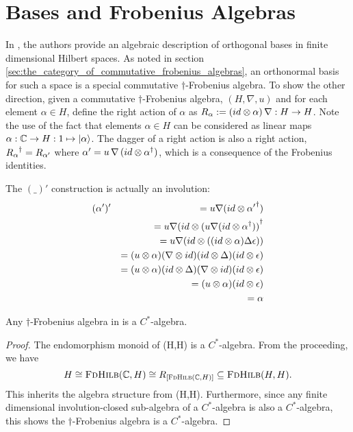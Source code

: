 \section{Bases and Frobenius Algebras} %
\label{sec:bases_and_frobenius_algebras}
In \cite{coeckeetal08:ortho}, the authors provide an algebraic description of orthogonal bases in
finite dimensional Hilbert spaces. As noted in section
\ref{sec:the_category_of_commutative_frobenius_algebras}, an orthonormal basis for such a space is
a special commutative $\dagger$-Frobenius algebra. To show the other direction, given a commutative
$\dagger$-Frobenius algebra, $(H,\nabla,u)$ and for each element $\alpha\in H$, define the right
action of $\alpha$ as $R_{\alpha}:=(id\otimes\alpha)\, \nabla:H\to H$. Note the use of the fact that
elements $\alpha\in H$ can be considered as linear maps $\alpha:\mathbb{C} \to H:1\mapsto \left\vert{\alpha}\right\rangle$.
The dagger of a right action is also a right action, ${R_{\alpha}}^{\dagger} = R_{\alpha'}$ where
$\alpha'= u\, \nabla\, (id\otimes {\alpha}^{\dagger})$, which is a consequence of the Frobenius identities.

The $(\_)'$ construction is actually an involution:
\begin{eqnarray*}
  &(\alpha')' &= u \nabla (id \otimes {\alpha'}^{\dagger}) \\
  && = u \nabla (id \otimes {(u \nabla (id \otimes \ensuremath{{\alpha}^{\dagger}}))}^{\dagger}\\
  && = u \nabla (id \otimes ( (id \otimes \alpha) \Delta \epsilon))\\
  && = (u \otimes \alpha) (\nabla \otimes id) (id \otimes \Delta) (id \otimes  \epsilon)\\
  && = (u \otimes \alpha) (id \otimes \Delta) (\nabla \otimes id) (id \otimes  \epsilon)\\
  && = (u \otimes \alpha)  (id \otimes  \epsilon)\\
  && = \alpha
\end{eqnarray*}

\begin{lemma}\label{lemma:cstaralgebra}
  Any $\dagger$-Frobenius algebra in \fdh is a $C^{*}$-algebra.
\end{lemma}
\begin{proof}
  The endomorphism monoid of \fdh(H,H) is a $C^{*}$-algebra. From the proceeding, we have
  \[
    H \cong \textsc{FdHilb}(\mathbb{C},H) \cong R_{[\textsc{FdHilb}(\mathbb{C},H)]}\subseteq\textsc{FdHilb}(H,H).
  \]
  This inherits the algebra structure from \fdh(H,H). Furthermore, since any finite dimensional
  involution-closed sub-algebra of a $C^{*}$-algebra is also a $C^{*}$-algebra, this shows the
  $\dagger$-Frobenius algebra is a $C^{*}$-algebra.
\end{proof}

